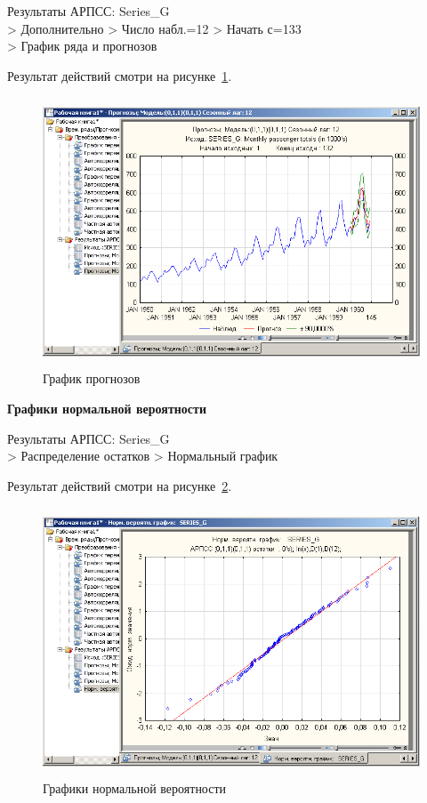 
\newpage

Результаты АРПСС: Series\_G\\
> Дополнительно
> Число набл.=12
> Начать с=133\\
> График ряда и прогнозов

Результат действий смотри на рисунке~\ref{fig:16}.

\begin{figure}[!h]
  \centering

  \includegraphics[height=8cm]
  {inc/Series_G/16.PNG}

  \caption{График прогнозов}

  \label{fig:16}
\end{figure}

\begin{center}
  \textbf{Графики нормальной вероятности}
\end{center}

Результаты АРПСС: Series\_G\\
> Распределение остатков
> Нормальный график

Результат действий смотри на рисунке~\ref{fig:17}.

\begin{figure}[!h]
  \centering

  \includegraphics[height=8cm]
  {inc/Series_G/17.PNG}

  \caption{Графики нормальной вероятности}

  \label{fig:17}
\end{figure}

